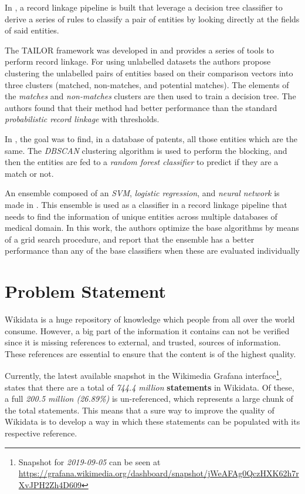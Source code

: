 \documentclass[epsfig,a4paper,11pt,titlepage,twoside,openany]{book}
\begin{document}
In \cite{Cochinwala2001}, a record linkage pipeline is built that leverage a decision tree classifier to derive a series of rules to classify a pair of entities by looking directly at the fields of said entities.

The TAILOR framework was developed in \cite{Elfeky_tailor} and provides a series of tools to perform record linkage. For using unlabelled datasets the authors propose clustering the unlabelled pairs of entities based on their comparison vectors into three clusters (matched, non-matches, and potential matches). The elements of the \textit{matches} and \textit{non-matches} clusters are then used to train a decision tree. The authors found that their method had better performance than the standard \textit{probabilistic record linkage} with thresholds. 

In \cite{kim2016random_forest_dbscan}, the goal was to find, in a database of patents, all those entities which are the same. The \textit{DBSCAN} clustering algorithm is used to perform the blocking, and then the entities are fed to a \textit{random forest classifier} to predict if they are a match or not. 

An ensemble composed of an \textit{SVM}, \textit{logistic regression}, and \textit{neural network} is made in \cite{KhaVo2019_metaensemble}. This ensemble is used as a classifier in a record linkage pipeline that needs to find the information of unique entities across multiple databases of medical domain. In this work, the authors optimize the base algorithms by means of a grid search procedure, and report that the ensemble has a better performance than any of the base classifiers when these are evaluated individually



\chapter{Problem Statement}
\label{chap:problem-statement}

Wikidata is a huge repository of knowledge which people from all over the world consume. However, a big part of the information it contains can not be verified since it is missing references to external, and trusted, sources of information. These references are essential to ensure that the content is of the highest quality. 

Currently, the latest available snapshot in the Wikimedia Grafana interface\footnote{Snapshot for \textit{2019-09-05} can be seen at \url{https://grafana.wikimedia.org/dashboard/snapshot/jWeAFAg0QczHXK62h7rXvJPH2Zh4D609}}, states that there are a total of \textit{744.4 million} \textbf{statements} in Wikidata. Of these, a full \textit{200.5 million (26.89\%)} is un-referenced, which represents a large chunk of the total statements. This means that a sure way to improve the quality of Wikidata is to develop a way in which these statements can be populated with its respective reference.
\end{document}

